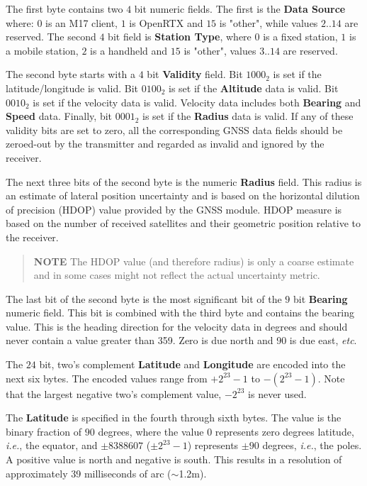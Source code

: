 \documentclass[a4paper,11pt,oneside]{book}
\begin{document}
The first byte contains two $4$ bit numeric fields. The first is the \textbf{Data Source} where: $0$ is an M17 client, $1$ is OpenRTX and $15$ is "other", while values $2..14$ are reserved. The second $4$ bit field is \textbf{Station Type}, where $0$ is a fixed station, $1$ is a mobile station, $2$ is a handheld and $15$ is "other", values $3..14$ are reserved.

The second byte starts with a $4$ bit \textbf{Validity} field. Bit $1000_2$ is set if the latitude/longitude is valid. Bit $0100_2$ is set if the \textbf{Altitude} data is valid. Bit $0010_2$ is set if the velocity data is valid. Velocity data includes both \textbf{Bearing} and \textbf{Speed} data. Finally, bit $0001_2$ is set if the \textbf{Radius} data is valid. If any of these validity bits are set to zero, all the corresponding GNSS data fields should be zeroed-out by the transmitter and regarded as invalid and ignored by the receiver.

The next three bits of the second byte is the numeric \textbf{Radius} field. This radius is an estimate of lateral position uncertainty and is based on the horizontal dilution of precision (HDOP) value provided by the GNSS module. HDOP measure is based on the number of received satellites and their geometric position relative to the receiver.
\begin{quote}
	\textbf{NOTE} The HDOP value (and therefore radius) is only a coarse estimate and in some cases might not reflect the actual uncertainty metric.
\end{quote}

The last bit of the second byte is the most significant bit of the $9$ bit \textbf{Bearing} numeric field. This bit is combined with the third byte and contains the bearing value. This is the heading direction for the velocity data in degrees and should never contain a value greater than 359. Zero is due north and 90 is due east, \textit{etc}.

The $24$ bit, two's complement \textbf{Latitude} and \textbf{Longitude} are encoded into the next six bytes. The encoded values range from $+2^{23}-1$ to $-(2^{23}-1)$. Note that the largest negative two's complement value, $-2^{23}$ is never used.

The \textbf{Latitude} is specified in the fourth through sixth bytes. The value is the binary fraction of $90$ degrees, where the value $0$ represents zero degrees latitude, \textit{i.e.}, the equator, and $\pm8388607$ ($\pm2^{23}-1$) represents $\pm90$ degrees, \textit{i.e.}, the poles. A positive value is north and negative is south. This results in a resolution of approximately 39 milliseconds of arc ($\sim$1.2m).
\end{document}
